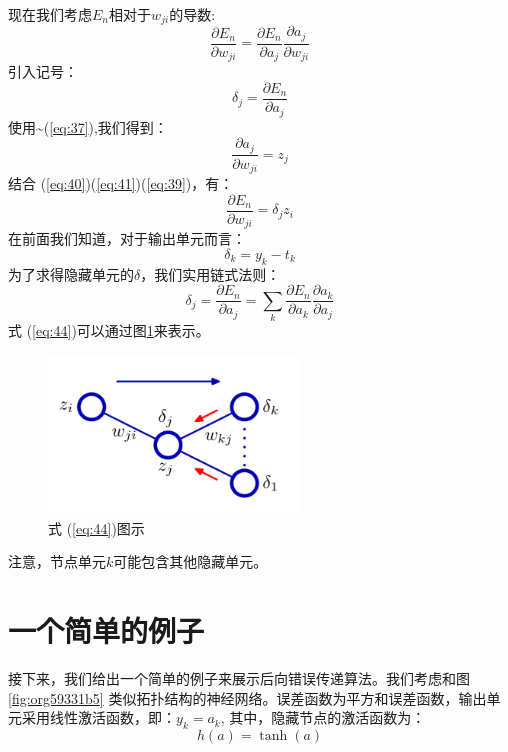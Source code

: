 \documentclass[10pt,a4paper,UTF8]{article}
\begin{document}
现在我们考虑\(E_{n}\)相对于\(w_{ji}\)的导数:
\begin{equation}
\label{eq:39}
\frac{\partial E_{n}}{\partial w_{ji}} = \frac{\partial E_{n}}{\partial a_{j}} \frac{\partial a_{j}}{\partial w_{ji}}
\end{equation}
引入记号：
\begin{equation}
\label{eq:40}
\delta_{j} = \frac{\partial E_{n}}{\partial a_{j}}
\end{equation}
使用\textasciitilde{}(\ref{eq:37}),我们得到：
\begin{equation}
\label{eq:41}
\frac{\partial a_{j}}{\partial w_{ji}} = z_{j}
\end{equation}
结合 (\ref{eq:40})(\ref{eq:41})(\ref{eq:39})，有：
\begin{equation}
\label{eq:42}
\frac{\partial E_{n}}{\partial w_{ji}} = \delta_{j} z_{i}
\end{equation}
在前面我们知道，对于输出单元而言：
\begin{equation}
\label{eq:43}
\delta_{k} = y_{k} -t_{k}
\end{equation}
为了求得隐藏单元的\(\delta\)，我们实用链式法则：
\begin{equation}
\label{eq:44}
\delta_{j} = \frac{\partial E_{n}}{\partial a_{j}} = \sum_{k} \frac{\partial E_{n}}{\partial a_{k}}\frac{\partial a_{k}}{\partial a_{j}}
\end{equation}
式 (\ref{eq:44})可以通过图\ref{fig:org8e4ad5f}来表示。
\begin{figure}[htbp]
\centering
\includegraphics[width=0.6\textwidth]{../../img/computer_prml/20170706eq44.png}
\caption{\label{fig:org8e4ad5f}
式 (\ref{eq:44})图示}
\end{figure}

注意，节点单元\(k\)可能包含其他隐藏单元。
\section{一个简单的例子}
\label{sec:org2bca44d}


接下来，我们给出一个简单的例子来展示后向错误传递算法。我们考虑和图 \ref{fig:org59331b5} 类似拓扑结构的神经网络。误差函数为平方和误差函数，输出单元采用线性激活函数，即：\(y_{k} = a_{k}\),  其中，隐藏节点的激活函数为：
\begin{equation}
\label{eq:45}
h(a) = \tanh(a)
\end{equation}
\end{document}
